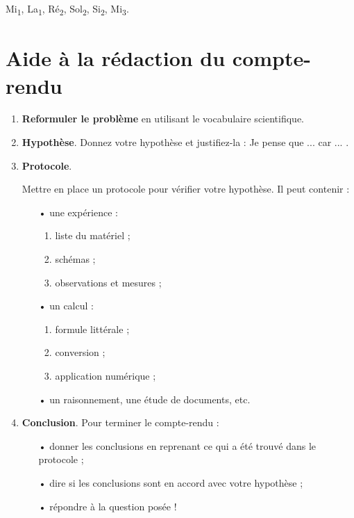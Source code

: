 \documentclass[12pt,a4paper]{article}
\begin{document}
\begin{multicols}{2}
\begin{doc}
\begin{center}
Mi\textsubscript{1}, La\textsubscript{1}, Ré\textsubscript{2}, Sol\textsubscript{2}, Si\textsubscript{2}, Mi\textsubscript{3}.
\end{center}
\end{doc}
\end{multicols}

\section*{Aide à la rédaction du compte-rendu}

\begin{enumerate}
\item \textbf{Reformuler le problème} en utilisant le vocabulaire scientifique. \hfill \app{}

\item \textbf{Hypothèse}. Donnez votre hypothèse et justifiez-la : \og Je pense que ... car ... \fg{}. \hfill \anarai{}

\item \textbf{Protocole}. \hfill \app{} \anarai{} \rea{}

Mettre en place un protocole pour vérifier votre hypothèse. Il peut contenir :
\vspace{-0.5\baselineskip}
\begin{multicols}{2}
\begin{itemize}
\item[•] une expérience :
\begin{enumerate}
\item liste du matériel ;
\item schémas ;
\item observations et mesures ;
\end{enumerate}
\item[•] un calcul :
\begin{enumerate}
\item formule littérale ;
\item conversion ;
\item application numérique ;
\end{enumerate}
\end{itemize}
\end{multicols}
\vspace{-1.\baselineskip}
\begin{itemize}
\item[•] un raisonnement, une étude de documents, etc.
\end{itemize}
\item \textbf{Conclusion}. Pour terminer le compte-rendu : \hfill \val{}
\begin{itemize}
\item[•] donner les conclusions en reprenant ce qui a été trouvé dans le protocole ;
\item[•] dire si les conclusions sont en accord avec votre hypothèse ;
\item[•] répondre à la question posée !
\end{itemize}
\end{enumerate}
\end{document}
